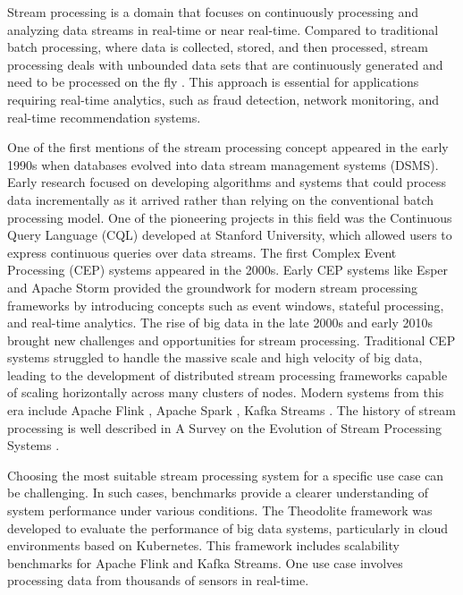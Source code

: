 Stream processing is a domain that focuses on continuously processing and analyzing data streams in real-time or near real-time.
Compared to traditional batch processing, where data is collected,
stored, and then processed, stream processing deals with unbounded data sets that are
continuously generated and need to be processed on the fly \cite{kleppmann2017, Dataflow2015, Zaharia2012RDD, flink_ml_reseach}.
This approach is essential for applications requiring real-time
analytics, such as fraud detection, network monitoring, and real-time recommendation systems.

One of the first mentions of the stream processing concept appeared in the early 1990s when databases
evolved into data stream management systems (DSMS).
Early research focused on developing algorithms and systems that could process
data incrementally as it arrived rather than relying on the conventional batch processing model.
One of the pioneering projects in this field was the Continuous Query Language (CQL)
developed at Stanford University, which allowed users to express continuous queries over data streams.
The first Complex Event Processing (CEP) systems appeared in the 2000s.
Early CEP systems like Esper and Apache Storm provided the groundwork for
modern stream processing frameworks by introducing concepts such as event windows,
stateful processing, and real-time analytics.
The rise of big data in the late 2000s and early 2010s brought
new challenges and opportunities for stream processing.
Traditional CEP systems struggled to handle the massive scale
and high velocity of big data, leading to the development of distributed stream processing
frameworks capable of scaling horizontally across many clusters of nodes.
Modern systems from this era include Apache Flink \cite{flink_dag}, Apache Spark \cite{spark_structured_streaming}, Kafka Streams \cite{kafka_streams_intro}.
The history of stream processing is well described in
A Survey on the Evolution of Stream Processing Systems \cite{fragkoulis2023survey}.

Choosing the most suitable stream processing system for a specific use case can be challenging.
In such cases, benchmarks provide a clearer understanding of system performance under various conditions.
The Theodolite framework \cite{theodolite_framework} was developed to evaluate the performance
of big data systems, particularly in cloud environments based on Kubernetes.
This framework includes scalability benchmarks for Apache Flink and Kafka Streams.
One use case involves processing data from thousands of sensors in real-time.


